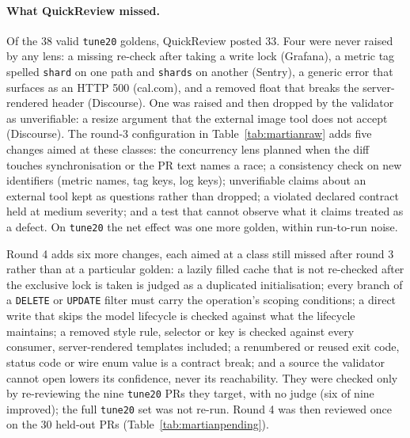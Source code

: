 \documentclass[11pt,a4paper]{article}
\newcommand{\qcr}{QuickReview}
\newcommand{\code}[1]{\texttt{#1}}
\begin{document}
\paragraph{What \qcr{} missed.} Of the 38 valid \code{tune20} goldens, \qcr{}
posted 33. Four were never raised by any lens: a missing re-check after
taking a write lock (Grafana), a metric tag spelled \code{shard} on one path
and \code{shards} on another (Sentry), a generic error that surfaces as an
HTTP 500 (cal.com), and a removed float that breaks the server-rendered
header (Discourse). One was raised and then dropped by the validator as
unverifiable: a resize argument that the external image tool does not accept
(Discourse). The round-3 configuration in Table~\ref{tab:martianraw} adds
five changes aimed at these classes: the concurrency lens planned when the
diff touches synchronisation or the PR text names a race; a consistency check
on new identifiers (metric names, tag keys, log keys); unverifiable claims
about an external tool kept as questions rather than dropped; a violated
declared contract held at medium severity; and a test that cannot observe
what it claims treated as a defect. On \code{tune20} the net effect was one
more golden, within run-to-run noise.

Round 4 adds six more changes, each aimed at a class still missed after
round 3 rather than at a particular golden: a lazily filled cache that is
not re-checked after the exclusive lock is taken is judged as a duplicated
initialisation; every branch of a \code{DELETE} or \code{UPDATE} filter must
carry the operation's scoping conditions; a direct write that skips the model
lifecycle is checked against what the lifecycle maintains; a removed style
rule, selector or key is checked against every consumer, server-rendered
templates included; a renumbered or reused exit code, status code or wire
enum value is a contract break; and a source the validator cannot open lowers
its confidence, never its reachability. They were checked only by re-reviewing
the nine \code{tune20} PRs they target, with no judge (six of nine improved);
the full \code{tune20} set was not re-run. Round 4 was then reviewed once on
the 30 held-out PRs (Table~\ref{tab:martianpending}).
\end{document}
